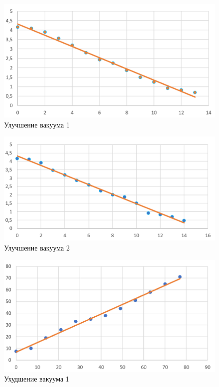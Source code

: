 \documentclass[a4paper,12pt]{article}
\begin{document}
\newpage

\begin{figure} [h!]
	\caption{Улучшение вакуума 1}
	\centering 
	\includegraphics[scale=0.8]{Улучшение1.png} 
\end{figure}

\begin{figure} [h!]
	\caption{Улучшение вакуума 2}
	\centering 
	\includegraphics[scale=0.8]{Улучшение2.png} 
\end{figure}


\newpage

\begin{figure} [h!]
	\caption{Ухудшение  вакуума 1}
	\centering 
	\includegraphics[scale=0.8]{Ухудшение1.png} 
\end{figure}
\end{document}
